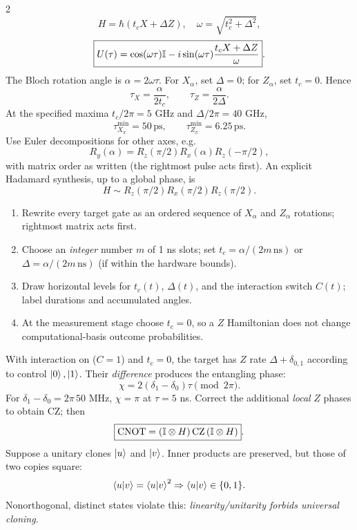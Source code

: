 \begin{multicols}{2}
\columnbreak
{}
\[H=\hbar(t_cX+\Delta Z),\quad\omega=\sqrt{t_c^2+\Delta^2},\]
\[\boxed{U(\tau)=\cos(\omega\tau)\mathbb I-i\sin(\omega\tau)\frac{t_cX+\Delta Z}{\omega}}.\]
The Bloch rotation angle is $\alpha=2\omega\tau$. For $X_\alpha$, set $\Delta=0$; for $Z_\alpha$, set $t_c=0$. Hence
\[\boxed{\tau_X=\frac\alpha{2t_c},\qquad\tau_Z=\frac\alpha{2\Delta}}.\]
At the specified maxima $t_c/2\pi=5$ GHz and $\Delta/2\pi=40$ GHz,
\[\tau_{X_\pi}^{\min}=50\,\mathrm{ps},\qquad\tau_{Z_\pi}^{\min}=6.25\,\mathrm{ps}.\]
Use Euler decompositions for other axes, e.g.
\[R_y(\alpha)=R_z(\pi/2)R_x(\alpha)R_z(-\pi/2),\]
with matrix order as written (the rightmost pulse acts first). An explicit Hadamard synthesis, up to a global phase, is
\[\boxed{H\sim R_z(\pi/2)R_x(\pi/2)R_z(\pi/2)}.\]

\begin{enumerate}
\item Rewrite every target gate as an ordered sequence of $X_\alpha$ and $Z_\alpha$ rotations; rightmost matrix acts first.
\item Choose an \emph{integer} number $m$ of 1 ns slots; set $t_c=\alpha/(2m\,\mathrm{ns})$ or $\Delta=\alpha/(2m\,\mathrm{ns})$ (if within the hardware bounds).
\item Draw horizontal levels for $t_c(t)$, $\Delta(t)$, and the interaction switch $C(t)$; label durations and accumulated angles.
\item At the measurement stage choose $t_c=0$, so a $Z$ Hamiltonian does not change computational-basis outcome probabilities.
\end{enumerate}

With interaction on ($C=1$) and $t_c=0$, the target has $Z$ rate $\Delta+\delta_{0,1}$ according to control $\left\lvert 0\right\rangle,\left\lvert 1\right\rangle$. Their \emph{difference} produces the entangling phase:
\[\boxed{\chi=2(\delta_1-\delta_0)\tau\pmod{2\pi}}.\]
For $\delta_1-\delta_0=2\pi\,50$ MHz, $\chi=\pi$ at $\tau=5$ ns. Correct the additional \emph{local} $Z$ phases to obtain CZ; then
\[\boxed{\mathrm{CNOT}=(\mathbb I\otimes H)\,\mathrm{CZ}\,(\mathbb I\otimes H)}.\]
Suppose a unitary clones $\left\lvert u\right\rangle$ and $\left\lvert v\right\rangle$. Inner products are preserved, but those of two copies square:
\[\left\langle u\middle|v\right\rangle=\left\langle u\middle|v\right\rangle^2\Rightarrow\left\langle u\middle|v\right\rangle\in\{0,1\}.\]
Nonorthogonal, distinct states violate this: \emph{linearity/unitarity forbids universal cloning}.
\end{multicols}